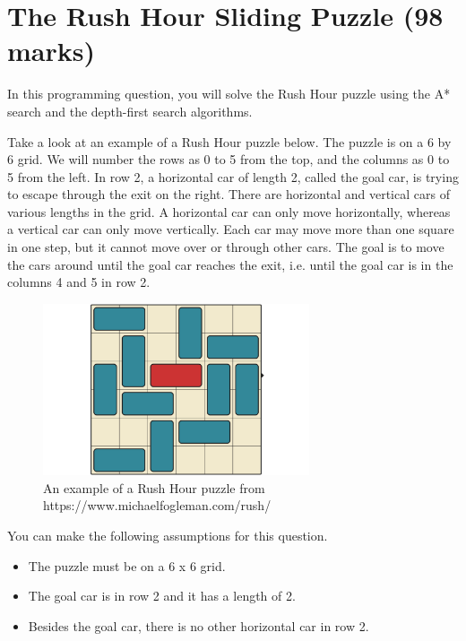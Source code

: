 \documentclass[12pt]{article}
\begin{document}
\newpage
\section{The Rush Hour Sliding Puzzle (98 marks)}

In this programming question, you will solve the Rush Hour puzzle using the A* search and the depth-first search algorithms.

Take a look at an example of a Rush Hour puzzle below. The puzzle is on a 6 by 6 grid. We will number the rows as 0 to 5 from the top, and the columns as 0 to 5 from the left. In row 2, a horizontal car of length 2, called the goal car, is trying to escape through the exit on the right. There are horizontal and vertical cars of various lengths in the grid. A horizontal car can only move horizontally, whereas a vertical car can only move vertically. Each car may move more than one square in one step, but it cannot move over or through other cars. The goal is to move the cars around until the goal car reaches the exit, i.e. until the goal car is in the columns 4 and 5 in row 2. 

\begin{figure}[ht]
\centering
\includegraphics[width=0.7\textwidth]{images_posted/rush_hour_example.png}
\caption{An example of a Rush Hour puzzle from https://www.michaelfogleman.com/rush/}
\label{rush_hour_example}
\end{figure}

You can make the following assumptions for this question.
\begin{itemize}
  \item The puzzle must be on a 6 x 6 grid.
  \item The goal car is in row 2 and it has a length of 2.
  \item Besides the goal car, there is no other horizontal car in row 2.
\end{itemize}
\end{document}
